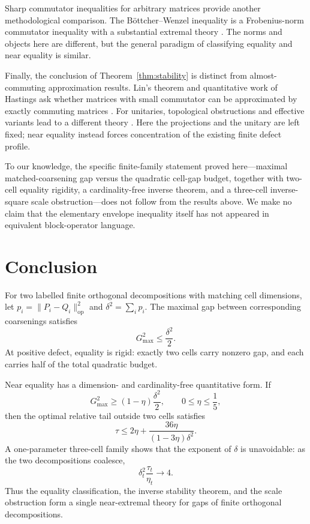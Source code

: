\documentclass[11pt]{article}
\newcommand{\op}{\mathrm{op}}
\newcommand{\gmax}{G_{\max}}
\newcommand{\dd}{\delta}
\begin{document}
Sharp commutator inequalities for arbitrary matrices provide another
methodological comparison.  The B{\"o}ttcher--Wenzel inequality is a
Frobenius-norm commutator inequality with a substantial extremal theory
\cite{BottcherWenzel2008}.  The norms and objects here are different, but the
general paradigm of classifying equality and near equality is similar.

Finally, the conclusion of Theorem~\ref{thm:stability} is distinct from
almost-commuting approximation results.  Lin's theorem and quantitative work
of Hastings ask whether matrices with small commutator can be approximated
by exactly commuting matrices
\cite{Lin1997AlmostCommuting,FriisRordam1996,Hastings2009}.  For unitaries,
topological obstructions and effective variants lead to a different theory
\cite{Voiculescu1983,ExelLoring1989,ExelLoring1991,
DorOnHallKachkovskiy2025,Herrera2024,Herrera2026}.
Here the projections and the unitary are left fixed; near equality instead
forces concentration of the existing finite defect profile.

To our knowledge, the specific finite-family statement proved here---maximal
matched-coarsening gap versus the quadratic cell-gap budget, together with
two-cell equality rigidity, a cardinality-free inverse theorem, and a
three-cell inverse-square scale obstruction---does not follow from the
results above.  We make no claim that the elementary envelope inequality
itself has not appeared in equivalent block-operator language.

\section{Conclusion}

For two labelled finite orthogonal decompositions with matching cell
dimensions, let $p_i=\|P_i-Q_i\|_{\op}^2$ and
$\dd^2=\sum_i p_i$.  The maximal gap between corresponding coarsenings
satisfies
\[
  \gmax^2\le\frac{\dd^2}{2}.
\]
At positive defect, equality is rigid: exactly two cells carry nonzero gap,
and each carries half of the total quadratic budget.

Near equality has a dimension- and cardinality-free quantitative form.  If
\[
  \gmax^2\ge(1-\eta)\frac{\dd^2}{2},
  \qquad 0\le\eta\le\frac15,
\]
then the optimal relative tail outside two cells satisfies
\[
  \tau\le
  2\eta+\frac{36\eta}{(1-3\eta)\dd^2}.
\]
A one-parameter three-cell family shows that the exponent of $\dd$ is
unavoidable: as the two decompositions coalesce,
\[
  \dd_t^2\frac{\tau_t}{\eta_t}\longrightarrow4.
\]
Thus the equality classification, the inverse stability theorem, and the
scale obstruction form a single near-extremal theory for gaps of finite
orthogonal decompositions.
\end{document}
